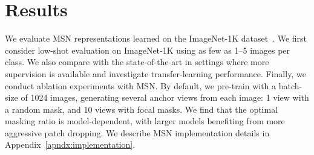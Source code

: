 \documentclass{article}
\begin{document}
\section{Results}
\label{sec:results}

We evaluate MSN representations learned on the ImageNet-1K dataset~\citep{russakovsky2015imagenet}.
We first consider low-shot evaluation on ImageNet-1K using as few as 1--5 images per class.
We also compare with the state-of-the-art in settings where more supervision is available and investigate transfer-learning performance. Finally, we conduct ablation experiments with MSN. By default, we pre-train with a batch-size of 1024 images, generating several anchor views from each image: 1 view with a random mask, and 10 views with focal masks. We find that the optimal masking ratio is model-dependent, with larger models benefiting from more aggressive patch dropping. We describe MSN implementation details in Appendix~\ref{apndx:implementation}.
\end{document}
